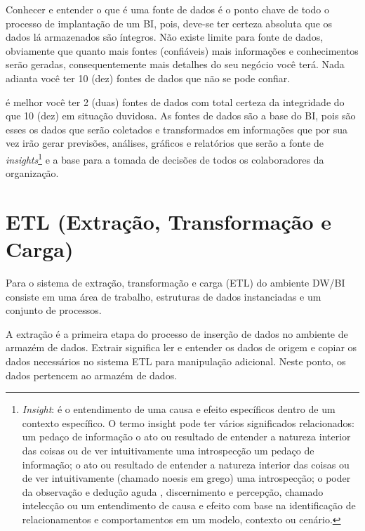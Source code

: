 Conhecer e entender o que \'{e} uma fonte de dados \'{e} o ponto chave de todo o processo de implanta\c{c}\~{a}o de um BI, pois, deve-se ter certeza absoluta que os dados l\'{a} armazenados s\~{a}o \'{i}ntegros. N\~{a}o existe limite para fonte de dados, obviamente que quanto mais fontes (confi\'{a}veis) mais informa\c{c}\~{o}es e conhecimentos ser\~{a}o geradas, consequentemente mais detalhes do seu neg\'{o}cio voc\^{e} ter\'{a}. Nada adianta voc\^{e} ter 10 (dez) fontes de dados que n\~{a}o se pode confiar. 

\'{e} melhor voc\^{e} ter 2 (duas) fontes de dados com total certeza da integridade do que 10 (dez) em situa\c{c}\~{a}o duvidosa. As fontes de dados s\~{a}o a base do BI, pois s\~{a}o esses os dados que ser\~{a}o coletados e transformados em informa\c{c}\~{o}es que por sua vez ir\~{a}o gerar previs\~{o}es, an\'{a}lises, gr\'{a}ficos e relat\'{o}rios que ser\~{a}o a fonte de \textit{insights}\footnote{\textit{Insight}: \'{e} o entendimento de uma causa e efeito espec\'{i}ficos dentro de um contexto espec\'{i}fico. O termo insight pode ter v\'{a}rios significados relacionados: um peda\c{c}o de informa\c{c}\~{a}o o ato ou resultado de entender a natureza interior das coisas ou de ver intuitivamente uma introspec\c{c}\~{a}o um peda\c{c}o de informa\c{c}\~{a}o; o ato ou resultado de entender a natureza interior das coisas ou de ver intuitivamente (chamado noesis em grego) uma introspec\c{c}\~{a}o; o poder da observa\c{c}\~{a}o e dedu\c{c}\~{a}o aguda , discernimento e percep\c{c}\~{a}o, chamado intelec\c{c}\~{a}o ou um entendimento de causa e efeito com base na identifica\c{c}\~{a}o de relacionamentos e comportamentos em um modelo, contexto ou cen\'{a}rio.} e a base para a tomada de decis\~{o}es de todos os colaboradores da organiza\c{c}\~{a}o.

\section{ETL (Extra\c{c}\~{a}o, Transforma\c{c}\~{a}o e Carga)}

Para \cite{dw-kimball-2013} o sistema de extra\c{c}\~{a}o, transforma\c{c}\~{a}o e carga (ETL) do ambiente DW/BI consiste em uma \'{a}rea de trabalho, estruturas de dados instanciadas e um conjunto de processos.

A extra\c{c}\~{a}o \'{e} a primeira etapa do processo de inser\c{c}\~{a}o de dados no ambiente de armaz\'{e}m de dados. Extrair significa ler e entender os dados de origem e copiar os dados necess\'{a}rios no sistema ETL para manipula\c{c}\~{a}o adicional. Neste ponto, os dados pertencem ao armaz\'{e}m de dados.

